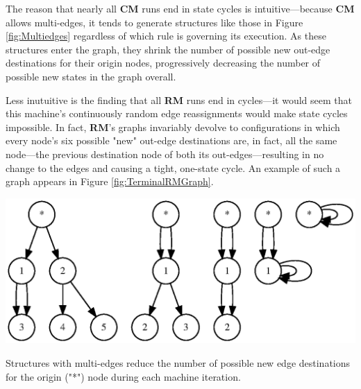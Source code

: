 \documentclass{tufte-handout}
\begin{document}
{The reason that nearly all \textbf{CM} runs end in state cycles is
intuitive---because \textbf{CM} allows multi-edges, it tends to generate structures
like those in Figure \ref{fig:Multiedges} regardless of which rule is governing its execution.
As these structures enter the graph, they 
shrink the number of possible new out-edge destinations for their origin nodes,
progressively decreasing the number of possible new states in the graph overall.

Less inutuitive is the finding that all \textbf{RM} runs end in cycles---it would
seem that this machine's continuously random edge reassignments would
make state cycles impossible. In fact, \textbf{RM}'s graphs invariably devolve
to configurations in which every node's six possible "new" out-edge destinations
are, in fact, all the same node---the previous destination node of both its
out-edges---resulting in no change to the edges and causing a tight, one-state cycle.
An example of such a graph appears in Figure \ref{fig:TerminalRMGraph}.


\begin{marginfigure}
\includegraphics{multiedges.ps}
\caption{Structures with multi-edges reduce the number of possible new edge destinations for
the origin ("*") node during each machine iteration.}
\label{fig:Multiedges}
\end{marginfigure}

}
\end{document}
